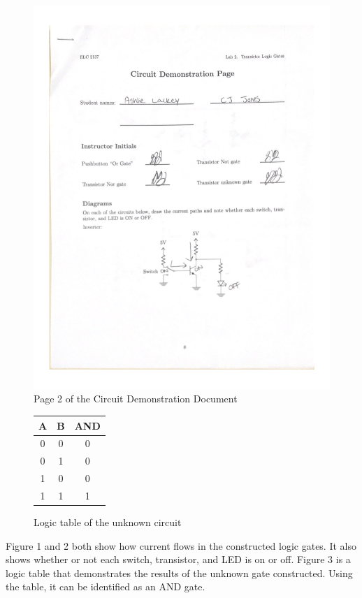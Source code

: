 \documentclass[11pt]{article}
\begin{document}
\begin{figure}
\includegraphics[page = 2, width=1.0\textwidth]{"Circuit Demonstration"}
\caption{Page 2 of the Circuit Demonstration Document}
\end{figure}

\begin{figure}[ht]\centering
	\begin{tabular}{cc|c}
		\toprule
		A & B & AND \\
		\midrule
		0 & 0 & 0 \\
		0 & 1 & 0 \\
		1 & 0 & 0 \\
		1 & 1 & 1 \\
		\bottomrule
	\end{tabular} 
	
	\caption{Logic table of the unknown circuit}
	
\end{figure}
Figure 1 and 2 both show how current flows in the constructed logic gates. It also shows whether or not each switch, transistor, and LED is on or off. Figure 3 is a logic table that demonstrates the results of the unknown gate constructed. Using the table, it can be identified as an AND gate.
\clearpage
\end{document}
